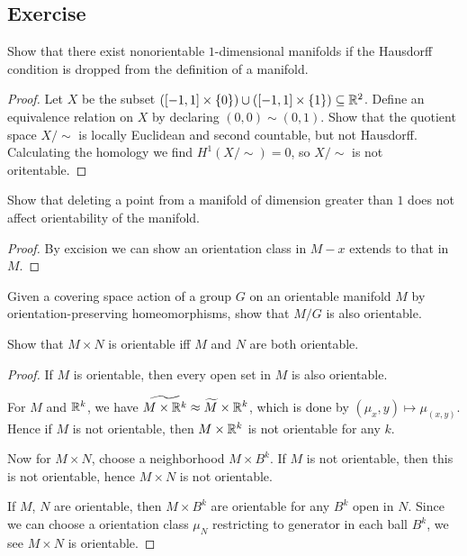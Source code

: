 \subsection{Exercise}
\begin{exercise}
Show that there exist nonorientable $1$-dimensional manifolds if the Hausdorff  condition is dropped from the definition of a manifold.
\end{exercise}
\begin{proof}
Let $X$ be the subset $([-1,1]\times\{0\})\cup([-1,1]\times\{1\})\subseteq\mathbb{R}^2$. Define an equivalence relation on $X$ by declaring $(0,0)\sim(0,1)$. Show that the quotient space $X/\sim$ is locally Euclidean and second countable, but not Hausdorff. Calculating the homology we find $H^1(X/\sim)=0$, so $X/\sim$ is not oritentable.
\end{proof}
\begin{exercise}
Show that deleting a point from a manifold of dimension greater than $1$ does not affect orientability of the manifold.
\end{exercise}
\begin{proof}
By excision we can show an orientation class in $M-x$ extends to that in $M$.
\end{proof}
\begin{exercise}
Given a covering space action of a group $G$ on an orientable manifold $M$ by orientation-preserving homeomorphisms, show that $M/G$ is also orientable.
\end{exercise}
\begin{exercise}
Show that $M\times N$ is orientable iff $M$ and $N$ are both orientable.
\end{exercise}
\begin{proof}
If $M$ is orientable, then every open set in $M$ is also orientable.\par
For $M$ and $\mathbb{R}^k$, we have $\widetilde{M\times\mathbb{R}^k}\approx\widetilde{M}\times\mathbb{R}^k$, which is done by $(\mu_x,y)\mapsto\mu_{(x,y)}$. Hence if $M$ is not orientable, then $M\times\mathbb{R}^k$ is not orientable for any $k$.\par
Now for $M\times N$, choose a neighborhood $M\times B^k$. If $M$ is not orientable, then this is not orientable, hence $M\times N$ is not orientable.\par
If $M$, $N$ are orientable, then $M\times B^k$ are orientable for any $B^k$ open in $N$. Since we can choose a orientation class $\mu_N$ restricting to generator in each ball $B^k$, we see $M\times N$ is orientable.
\end{proof}
